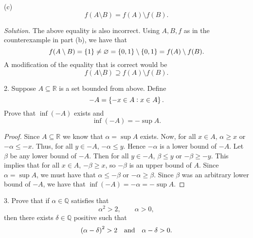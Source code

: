 \documentclass{article}
\newcommand{\Q}{\mathbb{Q}}
\newcommand{\R}{\mathbb{R}}
\begin{document}
\vspace{3mm}

(c)
%
\begin{equation*}
    f(A \setminus B) = f(A) \setminus f(B)
    .
\end{equation*}

\textit{Solution.} The above equality is also incorrect. Using $A, B, f$
as in the counterexample in part (b), we have that
%
\begin{equation*}
    f(A \setminus B)
        = \cbr{1}
        \neq \varnothing
        = \cbr{0, 1} \setminus \cbr{0, 1}
        = f(A) \setminus f(B)
    .
\end{equation*}
%
A modification of the equality that is correct would be
%
\begin{equation*}
    f(A \setminus B) \supseteq f(A) \setminus f(B)
    .
\end{equation*}

\newpage

2. Suppose $A \subseteq \R$ is a set bounded from above. Define
%
\begin{equation*}
   -A = \cbr{-x \in A : x \in A}
   .
\end{equation*}
%
Prove that $\inf(-A)$ exists and
%
\begin{equation*}
    \inf(-A) = -\sup A
    .
\end{equation*}

\begin{proof}

Since $A \subseteq \R$ we know that $\alpha = \sup A$ exists. Now, for
all $x \in A$, $\alpha \geq x$ or $-\alpha \leq -x$. Thus, for all $y
\in -A$, $-\alpha \leq y$. Hence $-\alpha$ is a lower bound of $-A$. Let
$\beta$ be any lower bound of $-A$. Then for all $y \in -A$, $\beta \leq
y$ or $-\beta \geq -y$. This implies that for all $x \in A$, $-\beta
\geq x$, so $-\beta$ is an upper bound of $A$. Since $\alpha = \sup A$,
we must have that $\alpha \leq -\beta$ or $-\alpha \geq \beta$. Since
$\beta$ was an arbitrary lower bound of $-A$, we have that $\inf(-A) =
-\alpha = - \sup A$.

\end{proof}

\newpage

3. Prove that if $\alpha \in \Q$ satisfies that
%
\begin{equation}
    \alpha^2 > 2, \qquad \alpha > 0
    ,
    \label{eq:q3-1}
\end{equation}
%
then there exists $\delta \in \Q$ positive such that
%
\begin{equation}
    \del{\alpha - \delta}^2 > 2
    \quad \text{and} \quad \alpha - \delta > 0
    .
    \label{eq:q3-2}
\end{equation}
\end{document}
